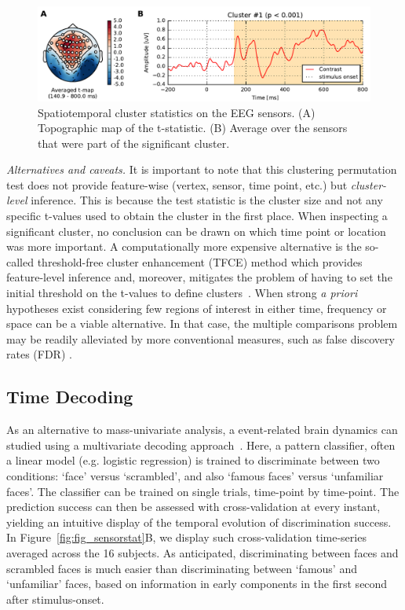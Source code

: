 \begin{figure}
\centering
\includegraphics{figures/spatiotemporal_stats_cluster_highpass-NoneHz-00.pdf}
\caption{Spatiotemporal cluster statistics on the EEG sensors. (A) Topographic map of the t-statistic. (B) Average over the sensors that were part of the significant cluster.}
\label{fig:stclusterstats}
\end{figure}
\emph{Alternatives and caveats.} It is important to note that this clustering permutation test does not provide feature-wise (vertex, sensor, time point, etc.) but \emph{cluster-level} inference. This is because the test statistic is the cluster size and not any specific t-values used to obtain the cluster in the first place. When inspecting a significant cluster, no conclusion can be drawn on which time point or location was more important. A computationally more expensive alternative is the so-called threshold-free cluster enhancement (TFCE) method which provides feature-level inference and, moreover, mitigates the problem of having to set the initial threshold on the t-values to define clusters~\citep{TFCE}. When strong \emph{a priori} hypotheses exist considering few regions of interest in either time, frequency or space can be a viable alternative. In that case, the multiple comparisons problem may be readily alleviated by more conventional measures, such as false discovery rates (FDR) \citep{FDR}.

\subsection{Time Decoding}

As an alternative to mass-univariate analysis, a event-related brain dynamics can studied using a multivariate decoding approach~\citep{ramkumar2013feature,king2014characterizing}. Here, a pattern classifier, often a linear model (e.g. logistic regression) is trained to discriminate between two conditions: `face' versus `scrambled', and also `famous faces' versus `unfamiliar faces'. The classifier can be trained on single trials, time-point by time-point. The prediction success can then be assessed with cross-validation at every instant, yielding an intuitive display of the temporal evolution of discrimination success. In Figure~\ref{fig:fig_sensorstat}B, we display such cross-validation time-series averaged across the 16 subjects. As anticipated, discriminating between faces and scrambled faces is much easier than discriminating between `famous' and `unfamiliar' faces, based on information in early components in the first second after stimulus-onset.

